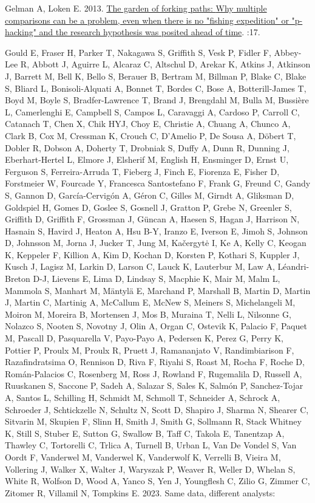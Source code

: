 \documentclass[10pt,a4paper]{article}
\newlength{\cslhangindent}
\newenvironment{CSLReferences}[2] %
 {\begin{list}{}{%
  \setlength{\itemindent}{0pt}
  \setlength{\leftmargin}{0pt}
  \setlength{\parsep}{0pt}
  \ifodd #1
   \setlength{\leftmargin}{\cslhangindent}
   \setlength{\itemindent}{-1\cslhangindent}
  \fi
  \setlength{\itemsep}{#2\baselineskip}}}
 {\end{list}}
\begin{document}
\begin{CSLReferences}{1}{0}
Gelman A, Loken E. 2013. \href{http://www.stat.columbia.edu/~gelman/research/unpublished/p_hacking.pdf}{The garden of forking paths: {Why} multiple comparisons can be a problem, even when there is no "fishing expedition" or "p-hacking" and the research hypothesis was posited ahead of time}. :17.

Gould E, Fraser H, Parker T, Nakagawa S, Griffith S, Vesk P, Fidler F, Abbey-Lee R, Abbott J, Aguirre L, Alcaraz C, Altschul D, Arekar K, Atkins J, Atkinson J, Barrett M, Bell K, Bello S, Berauer B, Bertram M, Billman P, Blake C, Blake S, Bliard L, Bonisoli-Alquati A, Bonnet T, Bordes C, Bose A, Botterill-James T, Boyd M, Boyle S, Bradfer-Lawrence T, Brand J, Brengdahl M, Bulla M, Bussière L, Camerlenghi E, Campbell S, Campos L, Caravaggi A, Cardoso P, Carroll C, Catanach T, Chen X, Chik HYJ, Choy E, Christie A, Chuang A, Chunco A, Clark B, Cox M, Cressman K, Crouch C, D'Amelio P, De Sousa A, Döbert T, Dobler R, Dobson A, Doherty T, Drobniak S, Duffy A, Dunn R, Dunning J, Eberhart-Hertel L, Elmore J, Elsherif M, English H, Ensminger D, Ernst U, Ferguson S, Ferreira-Arruda T, Fieberg J, Finch E, Fiorenza E, Fisher D, Forstmeier W, Fourcade Y, Francesca Santostefano F, Frank G, Freund C, Gandy S, Gannon D, García-Cervigón A, Géron C, Gilles M, Girndt A, Gliksman D, Goldspiel H, Gomes D, Goslee S, Gosnell J, Gratton P, Grebe N, Greenler S, Griffith D, Griffith F, Grossman J, Güncan A, Haesen S, Hagan J, Harrison N, Hasnain S, Havird J, Heaton A, Hsu B-Y, Iranzo E, Iverson E, Jimoh S, Johnson D, Johnsson M, Jorna J, Jucker T, Jung M, Kačergytė I, Ke A, Kelly C, Keogan K, Keppeler F, Killion A, Kim D, Kochan D, Korsten P, Kothari S, Kuppler J, Kusch J, Lagisz M, Larkin D, Larson C, Lauck K, Lauterbur M, Law A, Léandri-Breton D-J, Lievens E, Lima D, Lindsay S, Macphie K, Mair M, Malm L, Mammola S, Manhart M, Mäntylä E, Marchand P, Marshall B, Martin D, Martin J, Martin C, Martinig A, McCallum E, McNew S, Meiners S, Michelangeli M, Moiron M, Moreira B, Mortensen J, Mos B, Muraina T, Nelli L, Nilsonne G, Nolazco S, Nooten S, Novotny J, Olin A, Organ C, Ostevik K, Palacio F, Paquet M, Pascall D, Pasquarella V, Payo-Payo A, Pedersen K, Perez G, Perry K, Pottier P, Proulx M, Proulx R, Pruett J, Ramananjato V, Randimbiarison F, Razafindratsima O, Rennison D, Riva F, Riyahi S, Roast M, Rocha F, Roche D, Román-Palacios C, Rosenberg M, Ross J, Rowland F, Rugemalila D, Russell A, Ruuskanen S, Saccone P, Sadeh A, Salazar S, Sales K, Salmón P, Sanchez-Tojar A, Santos L, Schilling H, Schmidt M, Schmoll T, Schneider A, Schrock A, Schroeder J, Schtickzelle N, Schultz N, Scott D, Shapiro J, Sharma N, Shearer C, Sitvarin M, Skupien F, Slinn H, Smith J, Smith G, Sollmann R, Stack Whitney K, Still S, Stuber E, Sutton G, Swallow B, Taff C, Takola E, Tanentzap A, Thawley C, Tortorelli C, Trlica A, Turnell B, Urban L, Van De Vondel S, Van Oordt F, Vanderwel M, Vanderwel K, Vanderwolf K, Verrelli B, Vieira M, Vollering J, Walker X, Walter J, Waryszak P, Weaver R, Weller D, Whelan S, White R, Wolfson D, Wood A, Yanco S, Yen J, Youngflesh C, Zilio G, Zimmer C, Zitomer R, Villamil N, Tompkins E. 2023. Same data, different analysts: 
\end{CSLReferences}
\end{document}
